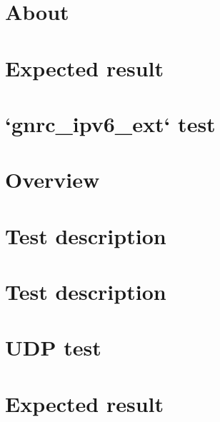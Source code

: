 \documentclass[twoside]{book}
\newcommand{\+}{\discretionary{\mbox{\scriptsize$\hookleftarrow$}}{}{}}
\begin{document}
\chapter{About}
\label{md__home_ayush_RIOT_tests_driver_xbee_README}

\chapter{Expected result}
\label{md__home_ayush_RIOT_tests_float_README}

\chapter{`gnrc\+\_\+ipv6\+\_\+ext` test}
\label{md__home_ayush_RIOT_tests_gnrc_ipv6_ext_README}

\chapter{Overview}
\label{md__home_ayush_RIOT_tests_gnrc_sock_dns_README}

\chapter{Test description}
\label{md__home_ayush_RIOT_tests_gnrc_tcp_client_README}

\chapter{Test description}
\label{md__home_ayush_RIOT_tests_gnrc_tcp_server_README}

\chapter{U\+DP test}
\label{md__home_ayush_RIOT_tests_gnrc_udp_README}

\chapter{Expected result}
\label{md__home_ayush_RIOT_tests_leds_README}

\end{document}
